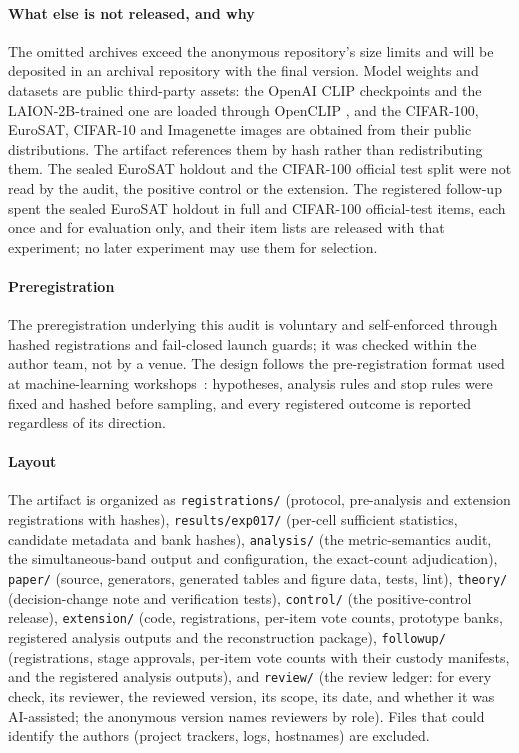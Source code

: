 \paragraph{What else is not released, and why}
The omitted archives exceed the anonymous repository's size limits and will be
deposited in an archival repository with the final version. Model weights and
datasets are public third-party assets: the OpenAI CLIP checkpoints
\cite{radford2021clip} and the LAION-2B-trained one \cite{schuhmann2022laion5b}
are loaded through OpenCLIP \cite{cherti2023openclip}, and the CIFAR-100,
EuroSAT, CIFAR-10 and Imagenette \cite{howard2019imagenette} images are
obtained from their public distributions. The artifact references them by hash rather than
redistributing them. The sealed EuroSAT holdout and the CIFAR-100 official test
split were not read by the audit, the positive control or the extension. The
registered follow-up spent the sealed EuroSAT holdout in full and \FUItemsCifarB{}
CIFAR-100 official-test items, each once and for evaluation only, and their
item lists are released with that experiment; no later experiment may use them
for selection.

\paragraph{Preregistration}
The preregistration underlying this audit is voluntary and self-enforced
through hashed registrations and fail-closed launch guards; it was checked
within the author team, not by a venue. The design follows the
pre-registration format used at machine-learning
workshops~\cite{bertinetto2021preregistration}: hypotheses, analysis rules and
stop rules were fixed and hashed before sampling, and every registered outcome
is reported regardless of its direction.

\paragraph{Layout}
The artifact is organized as \texttt{registrations/} (protocol, pre-analysis
and extension registrations with hashes), \texttt{results/exp017/} (per-cell
sufficient statistics, candidate metadata and bank hashes),
\texttt{analysis/} (the metric-semantics audit, the simultaneous-band output
and configuration, the exact-count adjudication), \texttt{paper/} (source,
generators, generated tables and figure data, tests, lint),
\texttt{theory/} (decision-change note and verification tests),
\texttt{control/} (the positive-control release), \texttt{extension/} (code,
registrations, per-item vote counts, prototype banks, registered analysis
outputs and the reconstruction package), \texttt{followup/} (registrations,
stage approvals, per-item vote counts with their custody manifests, and the
registered analysis outputs), and \texttt{review/} (the review
ledger: for every check, its reviewer, the reviewed version, its scope, its
date, and whether it was AI-assisted; the anonymous version names reviewers by
role). Files that could identify the authors
(project trackers, logs, hostnames) are excluded.

